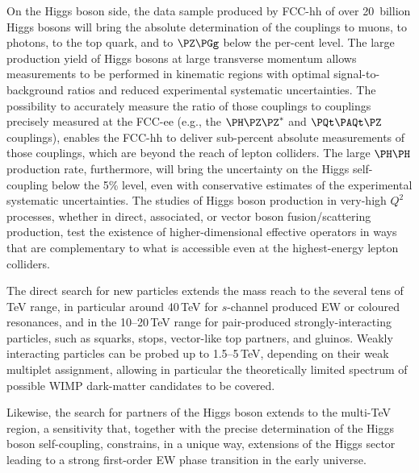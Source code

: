 On the Higgs boson side, the data sample produced by FCC-hh of over 20~billion Higgs bosons will bring the absolute determination of the couplings to muons, to photons, to the top quark, and to $\PZ\PGg$ below the per-cent level. 
The large production yield of Higgs bosons at large transverse momentum allows measurements to be performed in kinematic regions with optimal signal-to-background ratios and reduced experimental systematic uncertainties. 
The possibility to accurately measure the ratio of those couplings to couplings precisely measured at the FCC-ee 
(e.g., the $\PH\PZ\PZ^{*}$ and $\PQt\PAQt\PZ$ couplings), 
enables the FCC-hh to deliver sub-percent absolute measurements of those couplings, which are beyond the reach of lepton colliders. 
The large $\PH\PH$ production rate, furthermore, will bring the uncertainty on the Higgs self-coupling below the 5\% level, even with conservative estimates of the experimental systematic uncertainties. 
The studies of Higgs boson production in very-high $Q^2$ processes, whether in direct, associated, or vector boson fusion/scattering production, 
test the existence of higher-dimensional effective operators in ways that are complementary to what is accessible even at the highest-energy lepton colliders. 

The direct search for new particles extends the mass reach to the several tens of TeV range, in particular around 40\,TeV for $s$-channel produced EW or coloured resonances, and in the 10--20\,TeV range for pair-produced strongly-interacting particles, such as squarks, stops, vector-like top partners, and gluinos. 
Weakly interacting particles can be probed up to 1.5--5\,TeV, depending on their weak multiplet assignment, allowing in particular the theoretically limited spectrum of possible WIMP dark-matter candidates to be covered.

Likewise, the search for partners of the Higgs boson extends to the multi-TeV region, a sensitivity that, together with the precise determination of the Higgs boson self-coupling, constrains, in a unique way, extensions of the Higgs sector leading to a strong first-order EW phase transition in the early universe.

